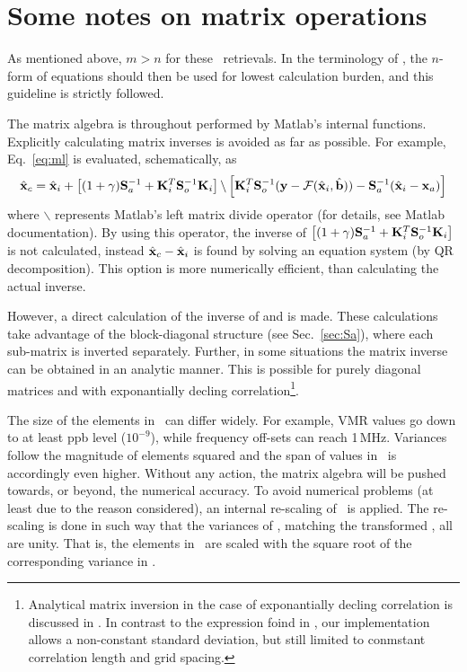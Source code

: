 \section{Some notes on matrix operations}
\label{sec:matrixops}
%
As mentioned above, $m>n$ for these \smr\ retrievals. In the terminology of 
\citet{rodgers:00}, the $n$-form of equations should then be used for lowest
calculation burden, and this guideline is strictly followed.

The matrix algebra is throughout performed by Matlab's internal functions. Explicitly calculating matrix inverses is avoided as far as possible. For
example, Eq.~\ref{eq:ml} is evaluated, schematically, as
\begin{displaymath}
  \hat{\mathbf{x}}_c = \hat{\mathbf{x}}_i + 
  \left[ (1+\gamma)\mathbf{S}_{a}^{-1} + 
          \mathbf{K}_{i}^T\mathbf{S}_{o}^{-1}\mathbf{K}_{i} \right] \backslash
  \left[ \mathbf{K}_{i}^T\mathbf{S}_{o}^{-1}(\mathbf{y}-\mathcal{F}(\hat{\mathbf{x}}_i,\hat{\mathbf{b}})) -
         \mathbf{S}_{a}^{-1}(\hat{\mathbf{x}}_i-\mathbf{x}_{a})\right]  
\end{displaymath}
where $\backslash$ represents Matlab's left matrix divide operator (for
details, see Matlab documentation). By using this operator, the inverse
of $\left[ (1+\gamma)\mathbf{S}_{a}^{-1} +
  \mathbf{K}_{i}^T\mathbf{S}_{o}^{-1}\mathbf{K}_{i} \right]$ is not calculated, instead
$\hat{\mathbf{x}}_c - \hat{\mathbf{x}}_i$ is found by solving an equation system (by QR
decomposition). This option is more numerically efficient, than calculating the
actual inverse.

However, a direct calculation of the inverse of  and  is
made. These calculations take advantage of the block-diagonal structure (see
Sec.~\ref{sec:Sa}), where each sub-matrix is inverted separately. Further, in
some situations the matrix inverse can be obtained in an analytic manner. This
is possible for purely diagonal matrices and with exponantially decling
correlation\footnote{Analytical matrix inversion in the case of exponantially
  decling correlation is discussed in \citet[][Sec.~10.3.2.2]{rodgers:00}. In
  contrast to the expression foind in \citet{rodgers:00}, our implementation
  allows a non-constant standard deviation, but still limited to conmstant
  correlation length and grid spacing.}.

The size of the elements in \SttVct\ can differ widely. For example, VMR values
go down to at least ppb level ($10^{-9}$), while frequency off-sets can reach
1\,MHz. Variances follow the magnitude of elements squared and the span of
values in \ is accordingly even higher. Without any action, the
matrix algebra will be pushed towards, or beyond, the numerical accuracy. To
avoid numerical problems (at least due to the reason considered), an internal
re-scaling of \SttVct\ is applied. The re-scaling is done in such way that the
variances of , matching the transformed \SttVct, all are unity. That
is, the elements in \SttVct\ are scaled with the square root of the
corresponding variance in .


